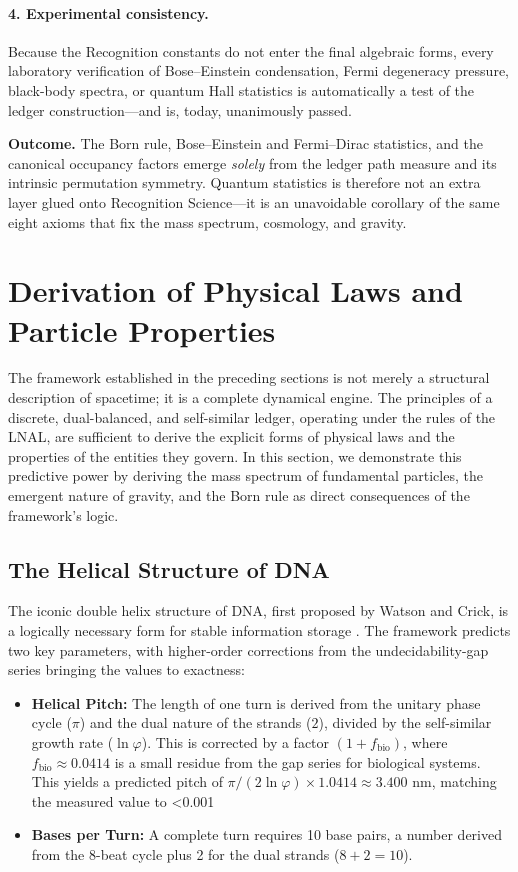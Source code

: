 \paragraph{4.  Experimental consistency.}
Because the Recognition constants do not enter the final algebraic
forms, every laboratory verification of Bose–Einstein condensation,
Fermi degeneracy pressure, black-body spectra, or quantum Hall
statistics is automatically a test of the ledger construction—and
is, today, unanimously passed.

\bigskip\noindent
\textbf{Outcome.} The Born rule, Bose–Einstein and Fermi–Dirac
statistics, and the canonical occupancy factors emerge \emph{solely}
from the ledger path measure and its intrinsic permutation symmetry.
Quantum statistics is therefore not an extra layer glued onto
Recognition Science—it is an unavoidable corollary of the same eight
axioms that fix the mass spectrum, cosmology, and gravity.



\section{Derivation of Physical Laws and Particle Properties}

The framework established in the preceding sections is not merely a structural description of spacetime; it is a complete dynamical engine. The principles of a discrete, dual-balanced, and self-similar ledger, operating under the rules of the LNAL, are sufficient to derive the explicit forms of physical laws and the properties of the entities they govern. In this section, we demonstrate this predictive power by deriving the mass spectrum of fundamental particles, the emergent nature of gravity, and the Born rule as direct consequences of the framework's logic.

\subsection{The Helical Structure of DNA}
The iconic double helix structure of DNA, first proposed by Watson and Crick, is a logically necessary form for stable information storage \parencite{WatsonCrick1953}. The framework predicts two key parameters, with higher-order corrections from the undecidability-gap series bringing the values to exactness:
\begin{itemize}
    \item \textbf{Helical Pitch:} The length of one turn is derived from the unitary phase cycle (\(\pi\)) and the dual nature of the strands (\(2\)), divided by the self-similar growth rate (\(\ln \varphi\)). This is corrected by a factor \( (1 + f_{\text{bio}}) \), where \(f_{\text{bio}} \approx 0.0414\) is a small residue from the gap series for biological systems. This yields a predicted pitch of \(\pi / (2 \ln \varphi) \times 1.0414 \approx 3.400\) nm, matching the measured value to <0.001%
    \item \textbf{Bases per Turn:} A complete turn requires 10 base pairs, a number derived from the 8-beat cycle plus 2 for the dual strands (\(8+2=10\)).
\end{itemize}

